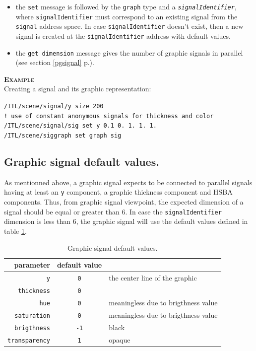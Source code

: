 \documentclass[a4paper,twoside]{report}
\newcommand{\subsublevel}[1]	{\subsection{#1}}
\newcommand{\fullref}[1]	{\ref{#1} p.\pageref{#1}}
\newcommand{\OSC}[1]		{\texttt{#1}}
\newcommand{\values}[1]	{\texttt{#1}}
\newcommand{\example}		{\textbf{\hspace{-1.5cm}\textbf{\textsc{Example }}}}
\newcommand{\sample}	[1]			{\vspace{-2mm}\begin{center}\colorbox{mygrey}{
								\begin{minipage}[t]{0.9\columnwidth} 
								{\small \texttt{#1}}
								\end{minipage}}\end{center}}
\begin{document}
\begin{itemize}
\item the \OSC{set} message is followed by the \OSC{graph} type and a \OSC{\textit{signalIdentifier}}, where \OSC{signalIdentifier} must correspond to an existing signal from the \OSC{signal} address space. In case \OSC{signalIdentifier} doesn't exist, then a new signal is created at the \OSC{signalIdentifier} address with default values. 
\item the \OSC{get dimension} message gives the number of graphic signals in parallel (see section \fullref{pgsignal}). 
 \end{itemize}
 
\example \\
Creating a signal and its graphic representation:
\sample{/ITL/scene/signal/y size 200  \\
! use of constant anonymous signals for thickness and color\\
/ITL/scene/signal/sig set y 0.1 0. 1. 1. 1.  \\
/ITL/scene/siggraph set graph sig 
}

\subsublevel{Graphic signal default values.}
As mentionned above, a graphic signal expects to be connected to parallel signals having at least an \values{y} component, a graphic thickness component and HSBA components. Thus, from graphic signal viewpoint, the expected dimension of a signal should be equal or greater than 6. In case the \OSC{signalIdentifier} dimension is less than 6, the graphic signal will use the default values defined in table \ref{gsigdefault}.

\begin{table}[htdp]
\caption{Graphic signal default values.}
\begin{center}
\begin{tabular}{|r|cl|}
\hline
parameter & default value & \\
\hline
\OSC{y}					& \OSC{0} & the center line of the graphic \\
\OSC{thickness}		& \OSC{0} & \\
\OSC{hue}				& \OSC{0} & meaningless due to brigthness value \\
\OSC{saturation}		& \OSC{0} & meaningless due to brigthness value \\
\OSC{brigthness}		& \OSC{-1} & black \\
\OSC{transparency}		& \OSC{1} & opaque \\
\hline
\end{tabular}
\end{center}
\label{gsigdefault}
\end{table}
\end{document}
